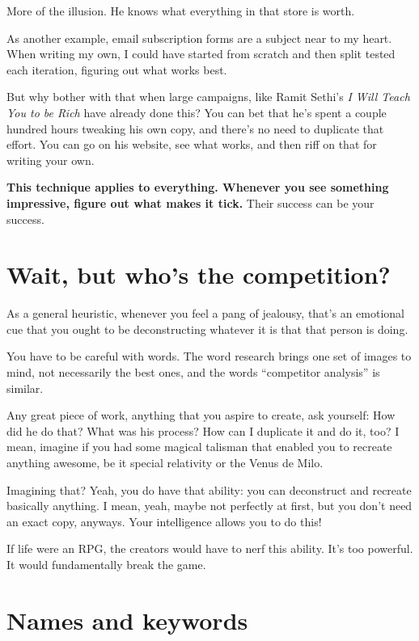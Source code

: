 More of the illusion. He knows what everything in that store is worth.

As another example, email subscription forms are a subject near to my
heart. When writing my own, I could have started from scratch and then split
tested each iteration, figuring out what works best.

But why bother with that when large campaigns, like Ramit Sethi's \textit{I Will
  Teach You to be Rich} have already done this? You can bet that he's spent a
couple hundred hours tweaking his own copy, and there's no need to duplicate
that effort. You can go on his website, see what works, and then riff on that
for writing your own.

\textbf{This technique applies to everything. Whenever you see something impressive,
  figure out what makes it tick.} Their success can be your success.

\section{Wait, but who's the competition?}

As a general heuristic, whenever you feel a pang of jealousy, that's an emotional cue that
you ought to be deconstructing whatever it is that that person is doing. 

You have to be careful with words. The word research brings one set of images to
mind, not necessarily the best ones, and the words ``competitor analysis'' is
similar.

Any great piece of work, anything that you aspire to create, ask yourself: How
did he do that? What was his process? How can I duplicate it and do it, too? I
mean, imagine if you had some magical talisman that enabled you to recreate
anything awesome, be it special relativity or the Venus de Milo.

Imagining that? Yeah, you do have that ability: you can deconstruct and recreate
basically anything. I mean, yeah, maybe not perfectly at first, but you don't
need an exact copy, anyways. Your intelligence allows you to do this!

If life were an RPG, the creators would have to nerf this ability. It's
too powerful. It would fundamentally break the game. 

\section{Names and keywords}

